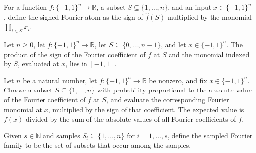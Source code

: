 \begin{definition}
\label{FABL.signedFourierAtom}
\leanok
{}
For a function $f:\{-1,1\}^n\to\mathbb R$, a subset $S\subseteq\{1,\ldots,n\}$, and an
input $x\in\{-1,1\}^n$, define the signed Fourier atom as the sign of $\widehat f(S)$
multiplied by the monomial $\prod_{i\in S}x_i$.
\end{definition}

\begin{theorem}
\label{FABL.signedFourierAtom_mem_Icc}
\leanok
{}
Let $n\ge 0$, let $f:\{-1,1\}^n\to\mathbb R$, let $S\subseteq\{0,\ldots,n-1\}$, and let
$x\in\{-1,1\}^n$. The product of the sign of the Fourier coefficient of $f$ at $S$ and
the monomial indexed by $S$, evaluated at $x$, lies in $[-1,1]$.
\end{theorem}

\begin{theorem}
\label{FABL.integral_signedFourierAtom_fourierAtomPMF}
\leanok
{}
Let $n$ be a natural number, let $f:\{-1,1\}^n\to\mathbb R$ be nonzero, and fix
$x\in\{-1,1\}^n$. Choose a subset $S\subseteq\{1,\ldots,n\}$ with probability
proportional to the absolute value of the Fourier coefficient of $f$ at $S$, and
evaluate the corresponding Fourier monomial at $x$, multiplied by the sign of that
coefficient. The expected value is $f(x)$ divided by the sum of the absolute values of
all Fourier coefficients of $f$.
\end{theorem}

\begin{definition}
\label{FABL.sampledFourierFamily}
\leanok
Given $s\in\mathbb N$ and samples $S_i\subseteq\{1,\ldots,n\}$ for $i=1,\ldots,s$,
define the sampled Fourier family to be the set of subsets that occur among the samples.
\end{definition}

